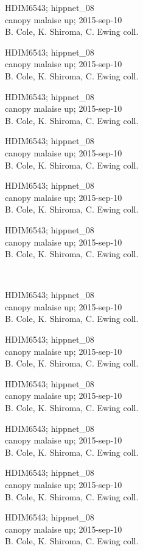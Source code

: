 \documentclass[2pt]{extarticle}
\begin{document}
\noindent
\parbox{0.16\textwidth}{\tiny \raggedright \rule[-0.3\baselineskip]{0pt}{10pt}HDIM6543; hippnet\_08\\ canopy malaise up; 2015-sep-10\\ B. Cole, K. Shiroma, C. Ewing coll.}
\parbox{0.16\textwidth}{\tiny \raggedright \rule[-0.3\baselineskip]{0pt}{10pt}HDIM6543; hippnet\_08\\ canopy malaise up; 2015-sep-10\\ B. Cole, K. Shiroma, C. Ewing coll.}
\parbox{0.16\textwidth}{\tiny \raggedright \rule[-0.3\baselineskip]{0pt}{10pt}HDIM6543; hippnet\_08\\ canopy malaise up; 2015-sep-10\\ B. Cole, K. Shiroma, C. Ewing coll.}
\parbox{0.16\textwidth}{\tiny \raggedright \rule[-0.3\baselineskip]{0pt}{10pt}HDIM6543; hippnet\_08\\ canopy malaise up; 2015-sep-10\\ B. Cole, K. Shiroma, C. Ewing coll.}
\parbox{0.16\textwidth}{\tiny \raggedright \rule[-0.3\baselineskip]{0pt}{10pt}HDIM6543; hippnet\_08\\ canopy malaise up; 2015-sep-10\\ B. Cole, K. Shiroma, C. Ewing coll.}
\parbox{0.16\textwidth}{\tiny \raggedright \rule[-0.3\baselineskip]{0pt}{10pt}HDIM6543; hippnet\_08\\ canopy malaise up; 2015-sep-10\\ B. Cole, K. Shiroma, C. Ewing coll.} \\ 
\vspace{0.001in} 

\noindent
\parbox{0.16\textwidth}{\tiny \raggedright \rule[-0.3\baselineskip]{0pt}{10pt}HDIM6543; hippnet\_08\\ canopy malaise up; 2015-sep-10\\ B. Cole, K. Shiroma, C. Ewing coll.}
\parbox{0.16\textwidth}{\tiny \raggedright \rule[-0.3\baselineskip]{0pt}{10pt}HDIM6543; hippnet\_08\\ canopy malaise up; 2015-sep-10\\ B. Cole, K. Shiroma, C. Ewing coll.}
\parbox{0.16\textwidth}{\tiny \raggedright \rule[-0.3\baselineskip]{0pt}{10pt}HDIM6543; hippnet\_08\\ canopy malaise up; 2015-sep-10\\ B. Cole, K. Shiroma, C. Ewing coll.}
\parbox{0.16\textwidth}{\tiny \raggedright \rule[-0.3\baselineskip]{0pt}{10pt}HDIM6543; hippnet\_08\\ canopy malaise up; 2015-sep-10\\ B. Cole, K. Shiroma, C. Ewing coll.}
\parbox{0.16\textwidth}{\tiny \raggedright \rule[-0.3\baselineskip]{0pt}{10pt}HDIM6543; hippnet\_08\\ canopy malaise up; 2015-sep-10\\ B. Cole, K. Shiroma, C. Ewing coll.}
\parbox{0.16\textwidth}{\tiny \raggedright \rule[-0.3\baselineskip]{0pt}{10pt}HDIM6543; hippnet\_08\\ canopy malaise up; 2015-sep-10\\ B. Cole, K. Shiroma, C. Ewing coll.} \\ 
\vspace{0.001in} 
\end{document}
